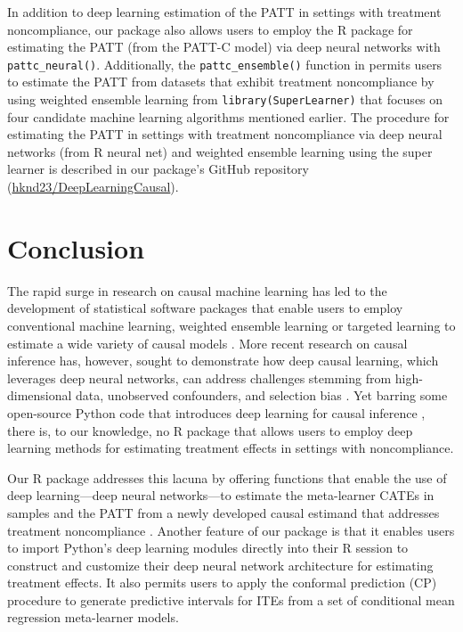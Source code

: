 In addition to deep learning estimation of the PATT in settings with
treatment noncompliance, our  package also
allows users to employ the R  package for estimating the
PATT (from the PATT-C model) via deep neural networks with
\texttt{pattc\_neural()}. Additionally, the \texttt{pattc\_ensemble()} function in
 permits users to estimate the PATT from
datasets that exhibit treatment noncompliance by using weighted ensemble
learning from \texttt{library(SuperLearner)} that focuses on four candidate
machine learning algorithms mentioned earlier. The procedure for
estimating the PATT in settings with treatment noncompliance via deep
neural networks (from R neural net) and weighted ensemble learning using
the super learner is described in our package's GitHub repository
(\href{https://github.com/hknd23/DeepLearningCausal}{hknd23/DeepLearningCausal}).

\section{Conclusion}\label{conclusion}

The rapid surge in research on causal machine learning has led to the
development of statistical software packages that enable users to employ
conventional machine learning, weighted ensemble learning or targeted
learning to estimate a wide variety of causal models \citep[e.g.,][]{vanderlaan2011targeted, nie2021quasi, knaus2022causalDML, Hu2022, zhao2023causalML}. More recent research on causal inference has,
however, sought to demonstrate how deep causal learning, which leverages
deep neural networks, can address challenges stemming from
high-dimensional data, unobserved confounders, and selection bias
\citep{goodfellow2016deep, Li2024survey, koch2024deepcausal}. Yet barring
some open-source Python code that introduces deep learning for causal
inference \citep{koch2024deepcausal}, there is, to our knowledge, no R
package that allows users to employ deep learning methods for estimating
treatment effects in settings with noncompliance.

Our R package addresses this lacuna by offering functions that enable
the use of deep learning---deep neural networks---to estimate the
meta-learner CATEs in samples and the PATT from a newly developed causal
estimand that addresses treatment noncompliance \citep{Kunzel2019meta, ottoboni2020PATT}. Another feature of our package is that it enables
users to import Python's deep learning modules directly into their R
session to construct and customize their deep neural network
architecture for estimating treatment effects. It also permits users to
apply the conformal prediction (CP) procedure to generate predictive
intervals for ITEs from a set of conditional mean regression
meta-learner models.

